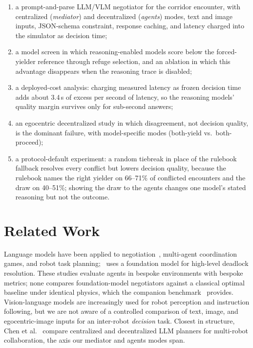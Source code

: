 \documentclass[journal]{IEEEtran}
\begin{document}
\begin{enumerate}
\item a prompt-and-parse LLM/VLM negotiator for the corridor encounter, with centralized (\emph{mediator}) and decentralized (\emph{agents}) modes, text and image inputs, JSON-schema constraint, response caching, and latency charged into the simulator as decision time;
\item a model screen in which reasoning-enabled models score below the forced-yielder reference through refuge selection, and an ablation in which this advantage disappears when the reasoning trace is disabled;
\item a deployed-cost analysis: charging measured latency as frozen decision time adds about 3.4\,s of excess per second of latency, so the reasoning models' quality margin survives only for sub-second answers;
\item an egocentric decentralized study in which disagreement, not decision quality, is the dominant failure, with model-specific modes (both-yield vs.\ both-proceed);
\item a protocol-default experiment: a random tiebreak in place of the rulebook fallback resolves every conflict but lowers decision quality, because the rulebook names the right yielder on 66--71\% of conflicted encounters and the draw on 40--51\%; showing the draw to the agents changes one model's stated reasoning but not the outcome.
\end{enumerate}

\section{Related Work}
Language models have been applied to negotiation~\cite{marlin2024,gamechat2025}, multi-agent coordination games, and robot task planning;~\cite{garg2024llm} uses a foundation model for high-level deadlock resolution. These studies evaluate agents in bespoke environments with bespoke metrics; none compares foundation-model negotiators against a classical optimal baseline under identical physics, which the companion benchmark~\cite{paper1} provides. Vision-language models are increasingly used for robot perception and instruction following, but we are not aware of a controlled comparison of text, image, and egocentric-image inputs for an inter-robot \emph{decision} task. Closest in structure, Chen et al.~\cite{chen2024scalable} compare centralized and decentralized LLM planners for multi-robot collaboration, the axis our mediator and agents modes span.
\end{document}
